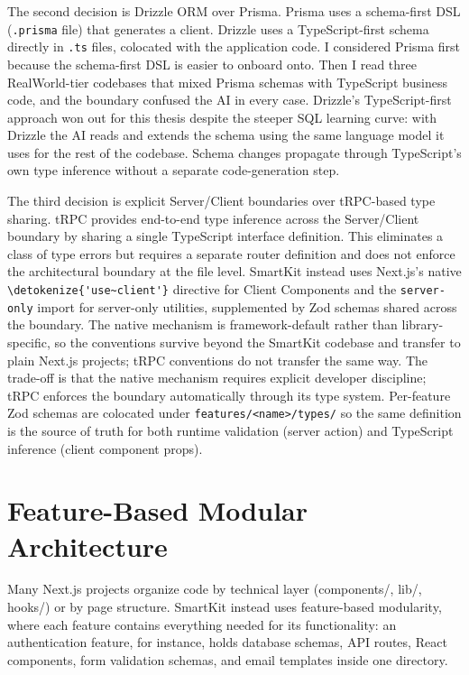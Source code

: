 \documentclass[12pt,a4paper]{report}
\newcommand{\code}[1]{\texttt{\nolinkurl{\detokenize{#1}}}}
\newcommand{\pkg}[1]{\texttt{\nolinkurl{#1}}}
\DeclareRobustCommand{\filename}[1]{\bgroup\urlstyle{tt}\nolinkurl{#1}\egroup}
\newcommand{\usec}{\code{'use~client'}}
\begin{document}
The second decision is Drizzle ORM over Prisma. Prisma uses a schema-first DSL (\filename{.prisma} file) that generates a client. Drizzle uses a TypeScript-first schema directly in \filename{.ts} files, colocated with the application code. I considered Prisma first because the schema-first DSL is easier to onboard onto. Then I read three RealWorld-tier codebases that mixed Prisma schemas with TypeScript business code, and the boundary confused the AI in every case. Drizzle's TypeScript-first approach won out for this thesis despite the steeper SQL learning curve: with Drizzle the AI reads and extends the schema using the same language model it uses for the rest of the codebase. Schema changes propagate through TypeScript's own type inference without a separate code-generation step.

The third decision is explicit Server/Client boundaries over tRPC-based type sharing. tRPC provides end-to-end type inference across the Server/Client boundary by sharing a single TypeScript interface definition. This eliminates a class of type errors but requires a separate router definition and does not enforce the architectural boundary at the file level. SmartKit instead uses Next.js's native \usec{} directive for Client Components and the \pkg{server-only} import \parencite{server-only-npm} for server-only utilities, supplemented by Zod schemas shared across the boundary. The native mechanism is framework-default rather than library-specific, so the conventions survive beyond the SmartKit codebase and transfer to plain Next.js projects; tRPC conventions do not transfer the same way. The trade-off is that the native mechanism requires explicit developer discipline; tRPC enforces the boundary automatically through its type system. Per-feature Zod schemas are colocated under \filename{features/<name>/types/} so the same definition is the source of truth for both runtime validation (server action) and TypeScript inference (client component props).

\section{Feature-Based Modular Architecture}

Many Next.js projects organize code by technical layer (components/, lib/, hooks/) or by page structure. SmartKit instead uses feature-based modularity, where each feature contains everything needed for its functionality: an authentication feature, for instance, holds database schemas, API routes, React components, form validation schemas, and email templates inside one directory.
\end{document}
